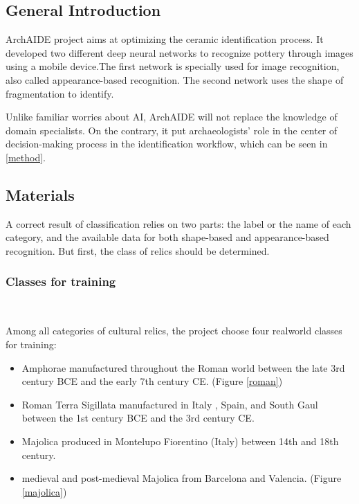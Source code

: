 \documentclass[journal]{IEEEtran}
\begin{document}
	\subsection{General Introduction}
	
	ArchAIDE project aims at optimizing the ceramic identification process. It developed two different deep neural networks to recognize pottery through images using a mobile device.The first network is specially used for image recognition, also called appearance-based recognition. The second network uses the shape of fragmentation to identify. 
	
	Unlike familiar worries about AI, ArchAIDE will not replace the knowledge of domain specialists. On the contrary, it put archaeologists' role in the center of decision-making process in the identification workflow, which can be seen in \ref{method}.
	
	\subsection{Materials}
	
	A correct result of classification relies on two parts: the label or the name of each category, and the available data for both shape-based and appearance-based recognition. But first, the class of relics should be determined.
	
	\subsubsection{Classes for training}
	\ 
	
	Among all categories of cultural relics, the project choose four realworld classes for training:
	
	\begin{itemize}
		\item Amphorae manufactured throughout the Roman world between the late 3rd century BCE and the early 7th century CE. (Figure \ref{roman})
		\item Roman Terra Sigillata manufactured in Italy , Spain, and South Gaul between the 1st century BCE and the 3rd century CE.
		\item Majolica produced in Montelupo Fiorentino (Italy) between 14th and 18th century.
		\item medieval and post-medieval Majolica from Barcelona and Valencia. (Figure \ref{majolica})
	\end{itemize}
	
\end{document}
